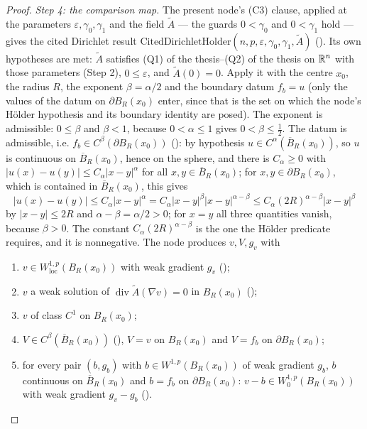 \begin{proof}
\emph{Step 4: the comparison map.}  The present node's (C3) clause, applied at
the parameters $\varepsilon,\gamma_0,\gamma_1$ and the field $\widetilde A$ ---
the guards $0<\gamma_0$ and $0<\gamma_1$ hold --- gives the cited Dirichlet
result
$\mathrm{CitedDirichletHolder}(n,p,\varepsilon,\gamma_0,\gamma_1,\widetilde A)$
().  Its own hypotheses are met: $\widetilde A$
satisfies (Q1) of the thesis--(Q2) of the thesis on $\mathbb{R}^n$ with those parameters
(Step 2), $0\le\varepsilon$, and $\widetilde A(0)=0$.  Apply it with the centre
$x_0$, the radius $R$, the exponent $\beta=\alpha/2$ and the boundary datum
$f_b=u$ (only the values of the datum on $\partial B_R(x_0)$ enter, since that
is the set on which the node's H\"older hypothesis and its boundary identity
are posed).  The exponent is admissible: $0\le\beta$ and $\beta<1$, because
$0<\alpha\le1$ gives $0<\beta\le\frac12$.  The datum is admissible, i.e.
$f_b\in C^\beta(\partial B_R(x_0))$ (): by hypothesis
$u\in C^\alpha(\overline B_R(x_0))$, so $u$ is continuous on
$\overline B_R(x_0)$, hence on the sphere, and there is $C_\alpha\ge0$ with
$|u(x)-u(y)|\le C_\alpha|x-y|^\alpha$ for all
$x,y\in\overline B_R(x_0)$; for $x,y\in\partial B_R(x_0)$, which is contained
in $\overline B_R(x_0)$, this gives
\[
|u(x)-u(y)|\le C_\alpha|x-y|^{\alpha}
=C_\alpha|x-y|^{\beta}|x-y|^{\alpha-\beta}
\le C_\alpha(2R)^{\alpha-\beta}|x-y|^{\beta}
\]
by $|x-y|\le2R$ and $\alpha-\beta=\alpha/2>0$; for $x=y$ all three quantities
vanish, because $\beta>0$.  The constant $C_\alpha(2R)^{\alpha-\beta}$ is the
one the H\"older predicate requires, and it is nonnegative.  The node produces
$v,V,g_v$ with
\begin{enumerate}
\item[(a$'$)] $v\in W^{1,p}_{\mathrm{loc}}(B_R(x_0))$ with weak gradient $g_v$
  ();
\item[(b$'$)] $v$ a weak solution of $\operatorname{div}\widetilde A(\nabla v)=0$
  in $B_R(x_0)$ ();
\item[(c$'$)] $v$ of class $C^1$ on $B_R(x_0)$;
\item[(d$'$)] $V\in C^\beta(\overline B_R(x_0))$ (),
  $V=v$ on $B_R(x_0)$ and $V=f_b$ on $\partial B_R(x_0)$;
\item[(e$'$)] for every pair $(b,g_b)$ with $b\in W^{1,p}(B_R(x_0))$ of weak
  gradient $g_b$, $b$ continuous on $\overline B_R(x_0)$ and $b=f_b$ on
  $\partial B_R(x_0)$: $v-b\in W^{1,p}_0(B_R(x_0))$ with weak gradient
  $g_v-g_b$ ().

\end{enumerate}
\end{proof}
